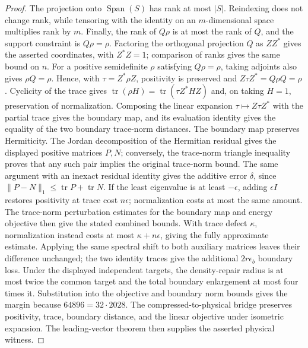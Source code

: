 \begin{proof}
    \leanok
    The projection onto $\operatorname{Span}(S)$ has rank at most $|S|$.
    Reindexing does not change rank, while tensoring with the identity on
    an $m$-dimensional space multiplies rank by $m$.  Finally, the rank of
    $Q\rho$ is at most the rank of $Q$, and the support constraint is
    $Q\rho=\rho$.  Factoring the orthogonal projection $Q$ as $ZZ^*$ gives
    the asserted coordinates, with $Z^*Z=1$; comparison of ranks gives the
    same bound on $n$.  For a positive semidefinite $\rho$ satisfying
    $Q\rho=\rho$, taking adjoints also gives $\rho Q=\rho$.  Hence, with
    $\tau=Z^*\rho Z$, positivity is preserved and
    $Z\tau Z^*=Q\rho Q=\rho$.  Cyclicity of the trace gives
    $\operatorname{tr}(\rho H)=\operatorname{tr}(\tau Z^*HZ)$ and, on taking
    $H=1$, preservation of normalization.  Composing the linear expansion
    $\tau\mapsto Z\tau Z^*$ with the partial trace gives the boundary map,
    and its evaluation identity gives the equality of the two boundary
    trace-norm distances. The boundary map preserves Hermiticity. The Jordan
    decomposition of the Hermitian residual gives the displayed positive
    matrices $P,N$; conversely, the trace-norm triangle inequality proves
    that any such pair implies the original trace-norm bound. The same
    argument with an inexact residual identity gives the additive error
    $\delta$, since
    $\lVert P-N\rVert_1\le\operatorname{tr}P+\operatorname{tr}N$.
    If the least eigenvalue is at least $-\epsilon$, adding $\epsilon I$
    restores positivity at trace cost $n\epsilon$; normalization costs at
    most the same amount. The trace-norm perturbation estimates for the
    boundary map and energy objective then give the stated combined bounds.
    With trace defect $\kappa$, normalization instead costs at most
    $\kappa+n\epsilon$, giving the fully approximate estimate.
    Applying the same spectral shift to both auxiliary matrices leaves their
    difference unchanged; the two identity traces give the additional
    $2r\epsilon_b$ boundary loss.
    Under the displayed independent targets, the density-repair radius is at
    most twice the common target and the total boundary enlargement at most
    four times it. Substitution into the objective and boundary norm bounds
    gives the margin because $64896=32\cdot2028$.
    The compressed-to-physical bridge preserves positivity, trace, boundary
    distance, and the linear objective under isometric expansion. The
    leading-vector theorem then supplies the asserted physical witness.

\end{proof}
